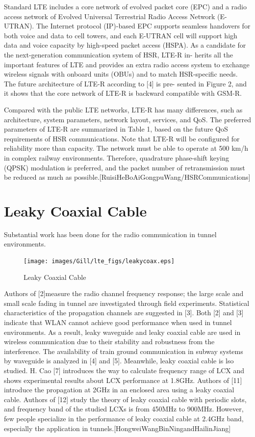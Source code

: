 Standard LTE includes a core network of evolved packet core (EPC) and a radio access network of Evolved
Universal Terrestrial Radio Access Network (E-UTRAN). The Internet protocol (IP)-based EPC supports seamless
handovers for both voice and data to cell towers, and each E-UTRAN cell will support high data and voice capacity by
high-speed packet access (HSPA). As a candidate for the next-generation communication system of HSR, LTE-R in-
herits all the important features of LTE and provides an extra radio access system to exchange wireless signals with
onboard units (OBUs) and to match HSR-specific needs. The future architecture of LTE-R according to [4] is pre-
sented in Figure 2, and it shows that the core network of LTE-R is backward compatible with GSM-R.

Compared with the public LTE networks, LTE-R has many differences, such as architecture, system parameters, network layout, services, and QoS. The preferred
parameters of LTE-R are summarized in Table 1, based on the future QoS requirements of HSR communications. Note that LTE-R will be configured for reliability
more than capacity. The network must be able to operate at 500 km/h in complex railway environments. Therefore, quadrature phase-shift keying (QPSK) modulation 
is ­preferred, and the packet number of retransmission must be reduced as much as possible.[RuisiHeBoAiGongpuWang/HSRCommunications]


\section{Leaky Coaxial Cable}
Substantial work has been done for the radio communication in tunnel environments. 

\begin{figure}[!ht]
\label{fig:leakcoax}
\centering
\texttt{[image: images/Gill/lte\_figs/leakycoax.eps]} 
\caption{Leaky Coaxial Cable}
\end{figure}

Authors of [2]measure the radio channel frequency response; the large scale and small scale
fading in tunnel are investigated through field experiments. Statistical characteristics of the propagation channels are
suggested in [3]. Both [2] and [3] indicate that WLAN cannot achieve good performance when used in tunnel environments.
As a result, leaky waveguide and leaky coaxial cable are used in wireless communication due to their stability and
robustness from the interference. The availability of train ground communication in subway systems by waveguide is
analyzed in [4] and [5]. Meanwhile, leaky coaxial cable is lso studied. H. Cao [7] introduces the way to calculate frequency range of LCX and shows experimental results about
LCX performance at 1.8GHz. Authors of [11] introduce the propagation at 2GHz in an enclosed area using a leaky coaxial
cable. Authors of [12] study the theory of leaky coaxial cable with periodic slots, and frequency band of the studied LCXs
is from 450MHz to 900MHz. However, few people specialize in the performance of leaky coaxial cable at 2.4GHz band, especially the application in tunnels.[HongweiWangBinNingandHailinJiang]

